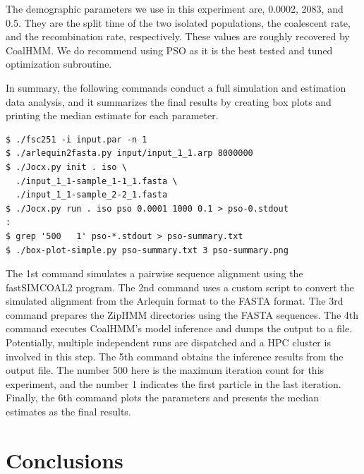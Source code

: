 \documentclass[graybox]{svmult}
\begin{document}
The demographic parameters we use in this experiment are, 0.0002, 2083, and 0.5.  They are the split time of the two isolated populations, the coalescent rate, and the recombination rate, respectively.  These values are roughly recovered by CoalHMM.  We do recommend using PSO as it is the best tested and tuned optimization subroutine.

In summary, the following commands conduct a full simulation and estimation data analysis, and it summarizes the final results by creating box plots and printing the median estimate for each parameter.

{\scriptsize{}\begin{verbatim}
$ ./fsc251 -i input.par -n 1
$ ./arlequin2fasta.py input/input_1_1.arp 8000000
$ ./Jocx.py init . iso \
  ./input_1_1-sample_1-1_1.fasta \
  ./input_1_1-sample_2-2_1.fasta
$ ./Jocx.py run . iso pso 0.0001 1000 0.1 > pso-0.stdout
:
$ grep '500   1' pso-*.stdout > pso-summary.txt
$ ./box-plot-simple.py pso-summary.txt 3 pso-summary.png
\end{verbatim}}

The 1st command simulates a pairwise sequence alignment using the fastSIMCOAL2 program.  The 2nd command uses a custom script to convert the simulated alignment from the Arlequin format to the FASTA format.  The 3rd command prepares the ZipHMM directories using the FASTA sequences.  The 4th command executes CoalHMM's model inference and dumps the output to a file.  Potentially, multiple independent runs are dispatched and a HPC cluster is involved in this step.  The 5th command obtains the inference results from the output file.  The number 500 here is the maximum iteration count for this experiment, and the number 1 indicates the first particle in the last iteration.  Finally, the 6th command plots the parameters and presents the median estimates as the final results.

\section{Conclusions}





\end{document}
